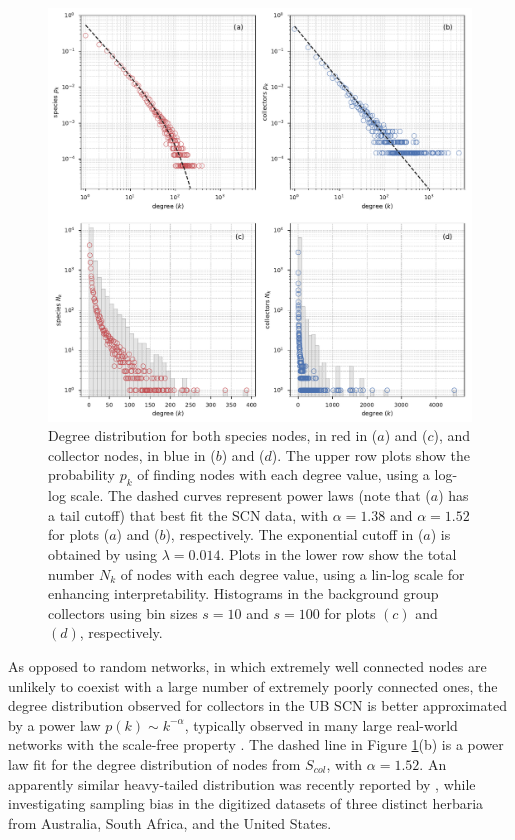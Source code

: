   \begin{figure}[t]
  	\centering
    \includegraphics[width=\linewidth]{figures/casestudy_ub/scn_degree_dist}
    \caption[Degree distribution for both species and collectors nodes.]{Degree distribution for both species nodes, in red in ($a$) and ($c$), and collector nodes, in blue in ($b$) and ($d$). The upper row plots show the probability $p_k$ of finding nodes with each degree value, using a log-log scale. The dashed curves represent power laws (note that ($a$) has a tail cutoff) that best fit the SCN data, with $\alpha=1.38$ and $\alpha=1.52$ for plots ($a$) and ($b$), respectively. The exponential cutoff in ($a$) is obtained by using $\lambda=0.014$. Plots in the lower row show the total number $N_k$ of nodes with each degree value, using a lin-log scale for enhancing interpretability. Histograms in the background group collectors using bin sizes $s=10$ and $s=100$ for plots $(c)$ and $(d)$, respectively.}
    \label{fig:ub_scn_degree_dist}
  \end{figure}

As opposed to random networks, in which extremely well connected nodes are unlikely to coexist with a large number of extremely poorly connected ones, the degree distribution observed for collectors in the UB SCN is better approximated by a power law $p(k) \sim k^{-\alpha}$, typically observed in many large real-world networks with the scale-free property \cite{Barabasi1999a}. 
The dashed line in Figure \ref{fig:ub_scn_degree_dist}(b) is a power law fit for the degree distribution of nodes from $S_{col}$, with $\alpha=1.52$. 
An apparently similar heavy-tailed distribution was recently reported by , while investigating sampling bias in the digitized datasets of three distinct herbaria from Australia, South Africa, and the United States.
  
